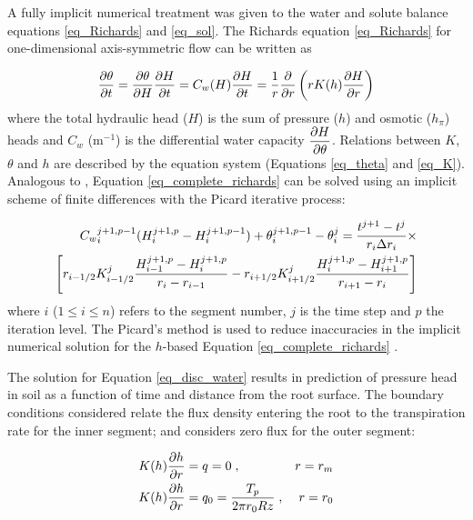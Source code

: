 A fully implicit numerical treatment was given to the water and solute balance equations \ref{eq_Richards} and \ref{eq_sol}.
The Richards equation \ref{eq_Richards} for one-dimensional axis-symmetric flow can be written as

\begin{equation}
\label{eq_complete_richards}
{\partial \theta \over \partial t} = {\partial \theta \over \partial H} {\partial H \over \partial t} = C_w(H) {\partial H \over \partial t} = {1 \over r}{\partial \over \partial r} \left( r K(h) {\partial H \over \partial r} \right)
\end{equation}
%
where the total hydraulic head ($H$) is the sum of pressure ($h$) and osmotic ($h_\pi$) heads and $C_w$ (m$^{-1}$) is the differential water capacity $\displaystyle{\partial H \over \partial\theta}$.
Relations between $K$, $\theta$ and $h$ are described by the \cite{genuchten80} equation system (Equations \ref{eq_theta} and \ref{eq_K}).
Analogous to \cite{vandam_feddes}, Equation \ref{eq_complete_richards} can be solved using an implicit scheme of finite differences with the Picard iterative process:

\begin{equation}
\label{eq_disc_water}
\begin{split}
  {C_w}_i^{j+1,p-1} (H_i^{j+1,p} - H_i^{j+1,p-1}) + \theta_i^{j+1,p-1}-\theta_i^j = {t^{j+1}-t^j \over r_i \Delta r_i} \times \\
  \left[  
  r_{i-1/2}K_{i-1/2}^j {H_{i-1}^{j+1,p}-H_i^{j+1,p} \over r_i-r_{i-1}}
  -
  r_{i+1/2}K_{i+1/2}^j {H_{i}^{j+1,p}-H_{i+1}^{j+1,p} \over r_{i+1}-r_{i}}
  \right]
\end{split}
\end{equation}
%
where $i$ ($1 \leq i \leq n$) refers to the segment number, $j$ is the time step and $p$ the iteration level. 
The Picard's method is used to reduce inaccuracies in the implicit numerical solution for the $h$-based Equation \ref{eq_complete_richards} \cite{celia}.

The solution for Equation \ref{eq_disc_water} results in prediction of pressure head in soil as a function of time and distance from the root surface. 
The boundary conditions considered relate the flux density entering the root to the transpiration rate for the inner segment; and considers zero flux for the outer segment:

\begin{align}
  \label{eq_bcw1}
  K(h) {\partial h \over \partial r} &= q = 0\;{\rm ,} &r=r_m \\
  \label{eq_bcw2}
  K(h) {\partial h \over \partial r} &= q_0 = {T_p \over 2 \pi r_0 R z}\;{\rm ,} &r=r_0   
\end{align}

